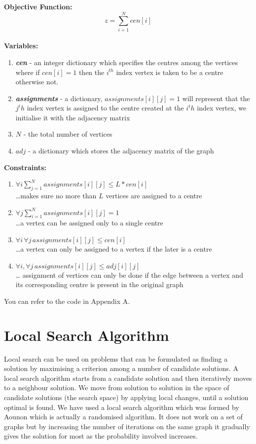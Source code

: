 \documentclass[12pt,a4paper,onecolumn]{article}
\begin{document}
\textbf{Objective Function:}\\
\hspace{15mm} $$z=\sum_{i=1}^{N}cen[i]$$
\\
\textbf{Variables:}\begin{enumerate}
\item \textit{\textbf{cen}} - an integer dictionary which specifies the centres among the vertices
where if $cen[i]=1$ then the $i^{th}$ index vertex is taken to be a centre otherwise not.\item \textit{\textbf{assignments}} - a dictionary, $assignments[i][j]=1$ will represent that the $j^th$ index vertex is assigned to the centre created at the $i^th$ index vertex, we initialise it with the adjacency matrix
\item \textit{\textbf{$N$}} - the total number of vertices
\item \textit{\textbf{$adj$}} - a dictionary which stores the adjacency matrix of the graph 
\end{enumerate}
\textbf{Constraints:}
\begin{enumerate}
\item $\forall i \sum_{j=1}^{N}assignments[i][j]\leq L*cen[i]$\\\hspace{1cm}\ldots makes sure no more than $L$ vertices are assigned to a centre
\item $\forall j \sum_{i=1}^{N}assignments[i][j] = 1$\\\hspace{1cm}\ldots a vertex can be assigned only to a single centre
\item $\forall i \, \forall j \, assignments[i][j] \leq cen[i]$\\\hspace{1cm}\ldots a vertex can only be assigned to a vertex if the later is a centre
\item $\forall i , \forall j \, assignments[i][j] \leq adj[i][j]$\\\hspace{1cm}\ldots 
assignment of vertices can only be done if the edge between a vertex and its corresponding centre is present in the original graph

\end{enumerate}

You can refer to the code in Appendix A.

\section{Local Search Algorithm}
Local search can be used on problems that can be formulated as finding a solution by maximising a criterion among a number of candidate solutions.
A local search algorithm starts from a candidate solution and then iteratively moves to a neighbour solution. We move from solution to solution in the space of candidate solutions (the search space) by applying local changes, until a solution optimal is found.
We have used a local search algorithm which was formed by Aounon which is actually a randomised algorithm. It does not work on a set of graphs but by increasing the number of iterations on the same graph it gradually gives the solution for most as the probability involved increases.
\end{document}
